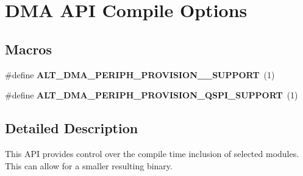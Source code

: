 \hypertarget{group__ALT__DMA__COMPILE}{}\section{D\+MA A\+PI Compile Options}
\label{group__ALT__DMA__COMPILE}
\subsection*{Macros}
\begin{DoxyCompactItemize}
\item 
\mbox{\label{group__ALT__DMA__COMPILE_ga79953d0cc15c9db60166eacdcb723dff}} 
\#define {\bfseries A\+L\+T\+\_\+\+D\+M\+A\+\_\+\+P\+E\+R\+I\+P\+H\+\_\+\+P\+R\+O\+V\+I\+S\+I\+O\+N\+\_\+\_\+\+S\+U\+P\+P\+O\+RT}~(1)
\item 
\mbox{\label{group__ALT__DMA__COMPILE_gaa8bba4cc6f79b37ab1975169bc9fe483}} 
\#define {\bfseries A\+L\+T\+\_\+\+D\+M\+A\+\_\+\+P\+E\+R\+I\+P\+H\+\_\+\+P\+R\+O\+V\+I\+S\+I\+O\+N\+\_\+\+Q\+S\+P\+I\+\_\+\+S\+U\+P\+P\+O\+RT}~(1)
\end{DoxyCompactItemize}


\subsection{Detailed Description}
This A\+PI provides control over the compile time inclusion of selected modules. This can allow for a smaller resulting binary. 